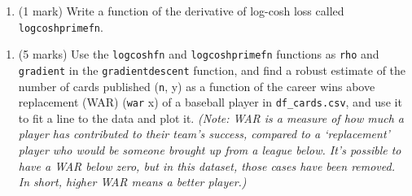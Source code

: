 \documentclass[
]{article}
\newenvironment{Shaded}{\begin{snugshade}}{\end{snugshade}}
\newcommand{\ControlFlowTok}[1]{\textcolor[rgb]{0.13,0.29,0.53}{\textbf{#1}}}
\newcommand{\DecValTok}[1]{\textcolor[rgb]{0.00,0.00,0.81}{#1}}
\newcommand{\DocumentationTok}[1]{\textcolor[rgb]{0.56,0.35,0.01}{\textbf{\textit{#1}}}}
\newcommand{\FunctionTok}[1]{\textcolor[rgb]{0.13,0.29,0.53}{\textbf{#1}}}
\newcommand{\NormalTok}[1]{#1}
\newcommand{\OtherTok}[1]{\textcolor[rgb]{0.56,0.35,0.01}{#1}}
\newcommand{\SpecialCharTok}[1]{\textcolor[rgb]{0.81,0.36,0.00}{\textbf{#1}}}
\providecommand{\tightlist}{%
  \setlength{\itemsep}{0pt}\setlength{\parskip}{0pt}}
\begin{document}
\begin{enumerate}
\def\labelenumi{\alph{enumi})}
\setcounter{enumi}{3}
\tightlist
\item
  (1 mark) Write a function of the derivative of log-cosh loss called
  \texttt{logcoshprimefn}.
\end{enumerate}

\begin{Shaded}
\end{Shaded}

\begin{enumerate}
\def\labelenumi{\alph{enumi})}
\setcounter{enumi}{4}
\tightlist
\item
  (5 marks) Use the \texttt{logcoshfn} and \texttt{logcoshprimefn}
  functions as \texttt{rho} and \texttt{gradient} in the
  \texttt{gradientdescent} function, and find a robust estimate of the
  number of cards published (\texttt{n}, y) as a function of the career
  wins above replacement (WAR) (\texttt{war} x) of a baseball player in
  \texttt{df\_cards.csv}, and use it to fit a line to the data and plot
  it. \emph{(Note: WAR is a measure of how much a player has contributed
  to their team's success, compared to a `replacement' player who would
  be someone brought up from a league below. It's possible to have a WAR
  below zero, but in this dataset, those cases have been removed. In
  short, higher WAR means a better player.)}
\end{enumerate}
\end{document}
